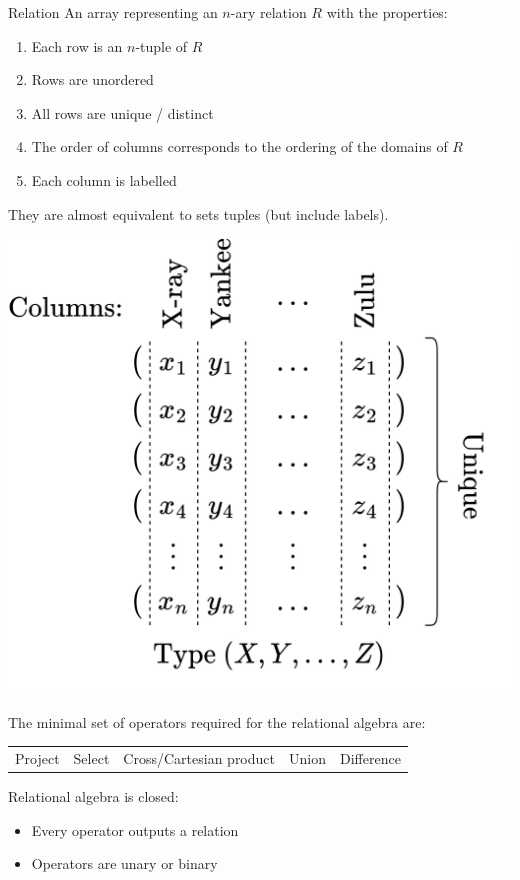 \begin{definitionbox}{Relation}
    An array representing an $n$-ary relation $R$ with the properties:
    \\ \begin{minipage}{.49\textwidth}
        \begin{enumerate}
            \setlength\itemsep{0em}
            \item Each row is an $n$-tuple of $R$
            \item Rows are unordered
            \item All rows are unique / distinct
            \item The order of columns corresponds to the ordering of the domains of $R$
            \item Each column is labelled
        \end{enumerate}
        They are almost equivalent to sets tuples (but include labels).
    \end{minipage}
    \hfill
    \begin{minipage}{.5\textwidth}
        \begin{center}
            \includegraphics[width=\textwidth]{relational_algebra/images/relation.drawio.png}
        \end{center}
    \end{minipage}
\end{definitionbox}

The minimal set of operators required for the relational algebra are:
\begin{center}
    \begin{tabular}{c c c c c}
        Project & Select & Cross/Cartesian product & Union & Difference \\
    \end{tabular}
\end{center}
Relational algebra is closed:
\begin{itemize}
  \item Every operator outputs a relation
  \item Operators are unary or binary
\end{itemize}

